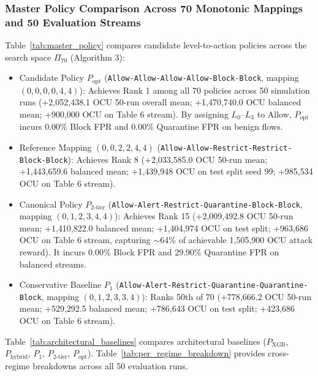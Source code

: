 \documentclass[journal,10pt,onecolumn]{IEEEtran}
\begin{document}
\subsubsection{Master Policy Comparison Across 70 Monotonic Mappings and 50 Evaluation Streams}
Table~\ref{tab:master_policy} compares candidate level-to-action policies across the search space $\Pi_{70}$ (Algorithm 3):
\begin{itemize}
    \item Candidate Policy $P_{\text{opt}}$ (\texttt{Allow-Allow-Allow-Allow-Block-Block}, mapping $(0,0,0,0,4,4)$): Achieves Rank 1 among all 70 policies across 50 simulation runs (+2,052,438.1 OCU 50-run overall mean; +1,470,740.0 OCU balanced mean; +900,000 OCU on Table 6 stream). By assigning $L_0$--$L_3$ to Allow, $P_{\text{opt}}$ incurs 0.00\% Block FPR and 0.00\% Quarantine FPR on benign flows.
    \item Reference Mapping $(0,0,2,2,4,4)$ (\texttt{Allow-Allow-Restrict-Restrict-Block-Block}): Achieves Rank 8 (+2,033,585.0 OCU 50-run mean; +1,443,659.6 balanced mean; +1,439,948 OCU on test split seed 99; +985,534 OCU on Table 6 stream).
    \item Canonical Policy $P_{2\text{-tier}}$ (\texttt{Allow-Alert-Restrict-Quarantine-Block-Block}, mapping $(0,1,2,3,4,4)$): Achieves Rank 15 (+2,009,492.8 OCU 50-run mean; +1,410,822.0 balanced mean; +1,404,974 OCU on test split; +963,686 OCU on Table 6 stream, capturing $\sim$64\% of achievable 1,505,900 OCU attack reward). It incurs 0.00\% Block FPR and 29.90\% Quarantine FPR on balanced streams.
    \item Conservative Baseline $P_1$ (\texttt{Allow-Alert-Restrict-Quarantine-Quarantine-Block}, mapping $(0,1,2,3,3,4)$): Ranks 50th of 70 (+778,666.2 OCU 50-run mean; +529,292.5 balanced mean; +786,643 OCU on test split; +423,686 OCU on Table 6 stream).
\end{itemize}

Table~\ref{tab:architectural_baselines} compares architectural baselines ($P_{\text{XGB}}$, $P_{\text{hybrid}}$, $P_1$, $P_{2\text{-tier}}$, $P_{\text{opt}}$). Table~\ref{tab:per_regime_breakdown} provides cross-regime breakdowns across all 50 evaluation runs.
\end{document}
